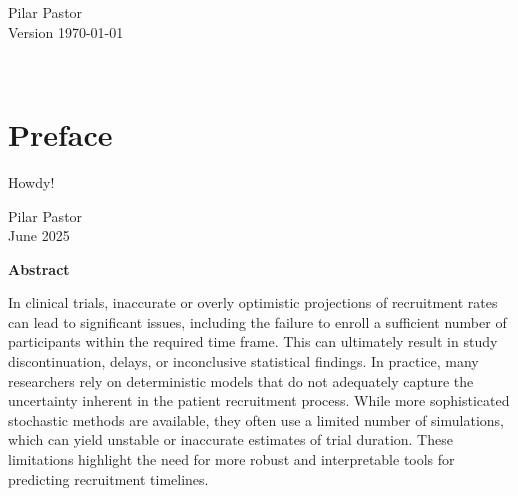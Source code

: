 \documentclass[11pt,a4paper,twoside]{book}
\begin{document}


\graphicspath{{./figure/}}
\setcounter{tocdepth}{1}

\thispagestyle{empty}
\begin{center}
  \vspace*{6cm}{\bfseries\Huge
  Frequentists and Bayesian methods to incorporate 
	recruitment rate stochasticity 
	at the design stage of a clinical trial
  }
  \vfill
  \rm

  \LARGE
  Pilar Pastor \\[12mm]
  
  \normalsize
  Version \today
\end{center}
\newpage
\thispagestyle{empty}~
\newpage
{}

\thispagestyle{plain}
\tableofcontents
{}

\chapter*{Preface}
\thispagestyle{plain}

Howdy!

\bigskip

\begin{flushright}
  Pilar Pastor \\
  June 2025
\end{flushright}


\cleardoublepage
{}

\begin{center}
\Large\textbf{Abstract}
\end{center}

\noindent
In clinical trials, inaccurate or overly optimistic projections of recruitment rates can lead to significant issues, including the failure to enroll a sufficient number of participants within the required time frame. This can ultimately result in study discontinuation, delays, or inconclusive statistical findings. In practice, many researchers rely on deterministic models that do not adequately capture the uncertainty inherent in the patient recruitment process. While more sophisticated stochastic methods are available, they often use a limited number of simulations, which can yield unstable or inaccurate estimates of trial duration. These limitations highlight the need for more robust and interpretable tools for predicting recruitment timelines.
\end{document}
